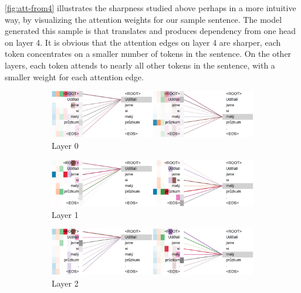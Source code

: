 \cref{fig:att-from4} illustrates the sharpness studied above perhaps in a more intuitive way, by visualizing the attention weights for our sample sentence.
The model generated this sample is \DepParse that translates and produces dependency from one head on layer 4.
It is obvious that the attention edges on layer 4 are sharper, each token concentrates on a smaller number of tokens in the sentence.
On the other layers, each token attends to nearly all other tokens in the sentence, with a smaller weight for each attention edge.

\begin{figure}[t]
    \centering
    \begin{subfigure}[b]{0.9\textwidth}
        \centering
	    \includegraphics[width=\textwidth]{img/att-from4-l0.png}
        \caption{Layer 0}
    \end{subfigure}
    \par\medskip
    \begin{subfigure}[b]{0.9\textwidth}
        \centering
	    \includegraphics[width=\textwidth]{img/att-from4-l1.png}
        \caption{Layer 1}
    \end{subfigure}
    \par\medskip
    \begin{subfigure}[b]{0.9\textwidth}
        \centering
	    \includegraphics[width=\textwidth]{img/att-from4-l2.png}
        \caption{Layer 2}
    \end{subfigure}
    \par\medskip
    \begin{subfigure}[b]{0.9\textwidth}

\end{subfigure}
\end{figure}
